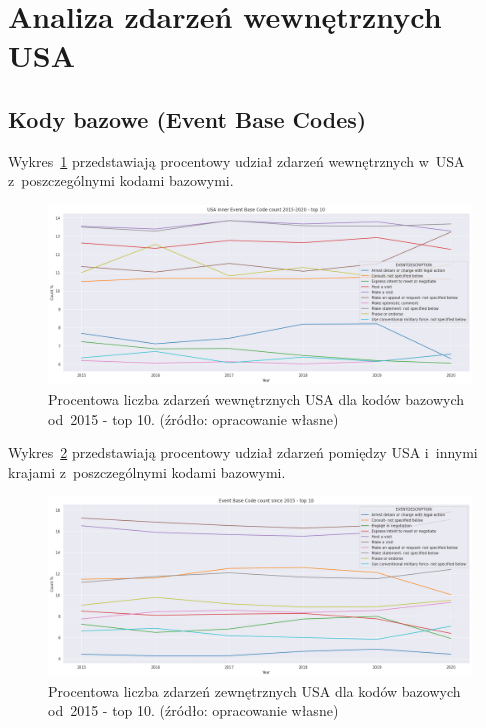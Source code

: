\documentclass[11pt]{report}
\begin{document}
    \section{Analiza zdarzeń wewnętrznych USA}

    \subsection{Kody bazowe (Event Base Codes)}\label{subsec:kody-bazowenullevent-base-codesnull2}
    Wykres~\ref{fig:USA_inner_EBCperc} przedstawiają procentowy udział zdarzeń wewnętrznych w~USA z~poszczególnymi kodami bazowymi.

    \begin{figure}[tp]
        \centering
        \includegraphics[width=\linewidth]{fig/USA inner/EBCperc.png}
        \caption{Procentowa liczba zdarzeń wewnętrznych USA dla kodów bazowych od~2015 - top 10. (źródło: opracowanie własne)}
        \label{fig:USA_inner_EBCperc}
    \end{figure}

    Wykres~\ref{fig:USA_not_inner_EBCperc} przedstawiają procentowy udział zdarzeń pomiędzy USA i~innymi krajami z~poszczególnymi kodami bazowymi.

    \begin{figure}[tp]
        \centering
        \includegraphics[width=\linewidth]{fig/USA not inner/EBCperc.png}
        \caption{Procentowa liczba zdarzeń zewnętrznych USA dla kodów bazowych od~2015 - top 10. (źródło: opracowanie własne)}
        \label{fig:USA_not_inner_EBCperc}
    \end{figure}
\end{document}
